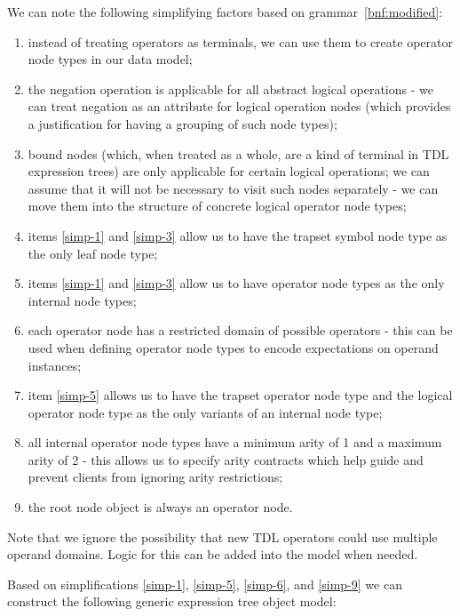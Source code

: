 \documentclass[12pt,oneside,a4paper,notitlepage]{report}
\begin{document}
	\par We can note the following simplifying factors based on grammar~\ref{bnf:modified}:
	\begin{enumerate}[label=\textbf{\arabic*.},ref=\textit{\arabic*}]
		\item \label{simp-1} instead of treating operators as terminals, we can use them to create operator node types in our data model;
		\item \label{simp-2} the negation operation is applicable for all abstract logical operations - we can treat negation as an attribute for logical operation nodes (which provides a justification for having a grouping of such node types);
		\item \label{simp-3} bound nodes (which, when treated as a whole, are a kind of terminal in TDL expression trees) are only applicable for certain logical operations; we can assume that it will not be necessary to visit such nodes separately - we can move them into the structure of concrete logical operator node types;
		\item \label{simp-4} items \ref{simp-1} and \ref{simp-3} allow us to have the trapset symbol node type as the only leaf node type;
		\item \label{simp-5} items \ref{simp-1} and \ref{simp-3} allow us to have operator node types as the only internal node types;
		\item \label{simp-6} each operator node has a restricted domain of possible operators - this can be used when defining operator node types to encode expectations on operand instances;
		\item \label{simp-7} item \ref{simp-5} allows us to have the trapset operator node type and the logical operator node type as the only variants of an internal node type;
		\item \label{simp-8} all internal operator node types have a minimum arity of 1 and a maximum arity of 2 - this allows us to specify arity contracts which help guide and prevent clients from ignoring arity restrictions;
		\item \label{simp-9} the root node object is always an operator node.
	\end{enumerate}

	Note that we ignore the possibility that new TDL operators could use multiple operand domains. Logic for this can be added into the model when needed.

	\newpage

	\par Based on simplifications \ref{simp-1}, \ref{simp-5}, \ref{simp-6}, and \ref{simp-9} we can construct the following generic expression tree object model:
	
\end{document}
